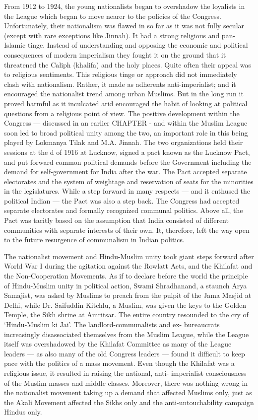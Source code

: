 \begin{multicols}{2}
From 1912 to 1924, the young nationalists began to overshadow the loyalists in the League which began to move nearer to the policies of the Congress. Unfortunately, their nationalism was flawed in so far as it was not fully secular (except with rare exceptions like Jinnah). It had a strong religious and pan-Islamic tinge. Instead of understanding and opposing the economic and political consequences of modern imperialism they fought it on the ground that it threatened the Caliph (khalifa) and the holy places. Quite often their appeal was to religious sentiments. This religious tinge or approach did not immediately clash with nationalism. Rather, it made as adherents anti-imperialist; and it encouraged the nationalist trend among urban Muslims. But in the long run it proved harmful as it inculcated arid encouraged the habit of looking at political questions from a religious point of view. The positive development within the Congress --- discussed in an earlier CHAPTER - and within the Muslim League soon led to broad political unity among the two, an important role in this being played by Lokmanya Tilak and M.A. Jinnah. The two organizations held their sessions at the d of 1916 at Lucknow, signed a pact known as the Lucknow Pact, and put forward common political demands before the Government including the demand for self-government for India after the war. The Pact accepted separate electorates and the system of weightage and reservation of seats for the minorities in the legislatures. While a step forward in many respects --- and it enthused the political Indian --- the Pact was also a step back. The Congress had accepted separate electorates and formally recognized communal politics. Above all, the Pact was tacitly based on the assumption that India consisted of different communities with separate interests of their own. It, therefore, left the way open to the future resurgence of communalism in Indian politics. 

The nationalist movement and Hindu-Muslim unity took giant steps forward after World War I during the agitation against the Rowlatt Acts, and the Khilafat and the Non-Cooperation Movements. As if to declare before the world the principle of Hindu-Muslim unity in political action, Swami Shradhanand, a staunch Arya Samajist, was asked by Muslims to preach from the pulpit of the Jama Masjid at Delhi, while Dr. Saifuddin Kitchlu, a Muslim, was given the keys to the Golden Temple, the Sikh shrine at Amritsar. The entire country resounded to the cry of `Hindu-Muslim ki Jai'. The landlord-communalists and ex- bureaucrats increasingly disassociated themselves from the Muslim League, while the League itself was overshadowed by the Khilafat Committee as many of the League leaders --- as also many of the old Congress leaders --- found it difficult to keep pace with the politics of a mass movement. Even though the Khilafat was a religious issue, it resulted in raising the national, anti- imperialist consciousness of the Muslim masses and middle classes. Moreover, there was nothing wrong in the nationalist movement taking up a demand that affected Muslims only, just as the Akali Movement affected the Sikhs only and the anti-untouchability campaign Hindus only. 


\end{multicols}
